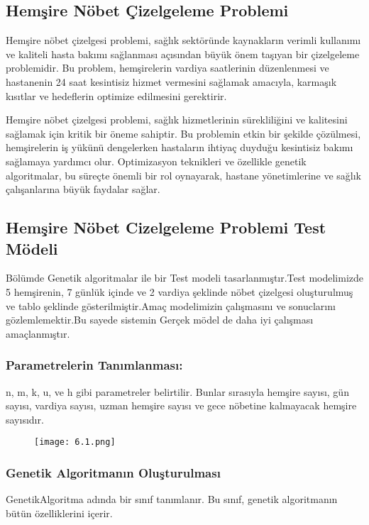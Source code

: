 \documentclass[12pt, a4paper]{article}
\begin{document}
\begin{flushleft}
\subsection{Hemşire Nöbet Çizelgeleme Problemi}
\item Hemşire nöbet çizelgesi problemi, sağlık sektöründe kaynakların verimli kullanımı ve kaliteli hasta bakımı sağlanması açısından büyük önem taşıyan bir çizelgeleme problemidir. Bu problem, hemşirelerin vardiya saatlerinin düzenlenmesi ve hastanenin 24 saat kesintisiz hizmet vermesini sağlamak amacıyla, karmaşık kısıtlar ve hedeflerin optimize edilmesini gerektirir.\\[5pt]
\item Hemşire nöbet çizelgesi problemi, sağlık hizmetlerinin sürekliliğini ve kalitesini sağlamak için kritik bir öneme sahiptir. Bu problemin etkin bir şekilde çözülmesi, hemşirelerin iş yükünü dengelerken hastaların ihtiyaç duyduğu kesintisiz bakımı sağlamaya yardımcı olur. Optimizasyon teknikleri ve özellikle genetik algoritmalar, bu süreçte önemli bir rol oynayarak, hastane yönetimlerine ve sağlık çalışanlarına büyük faydalar sağlar.


 


	\subsection{Hemşire Nöbet Cizelgeleme Problemi Test Mödeli}
	
	Bölümde Genetik algoritmalar ile  bir Test modeli tasarlanmıştır.Test modelimizde 5 hemşirenin, 7 günlük içinde ve  2 vardiya şeklinde nöbet çizelgesi oluşturulmuş ve tablo şeklinde gösterilmiştir.Amaç modelimizin çalışmasını ve sonuclarını gözlemlemektir.Bu sayede sistemin Gerçek mödel de daha iyi çalışması amaçlanmıştır.
	
\subsubsection{Parametrelerin Tanımlanması:} n, m, k, u, ve h gibi parametreler belirtilir. Bunlar sırasıyla hemşire sayısı, gün sayısı, vardiya sayısı, uzman hemşire sayısı ve gece nöbetine kalmayacak hemşire sayısıdır.

\begin{figure}[!h]
	\centering
	\texttt{[image: 6.1.png]}
	
\end{figure}

\subsubsection{Genetik Algoritmanın Oluşturulması} GenetikAlgoritma adında bir sınıf tanımlanır. Bu sınıf, genetik algoritmanın bütün özelliklerini içerir.

\end{flushleft}
\end{document}
